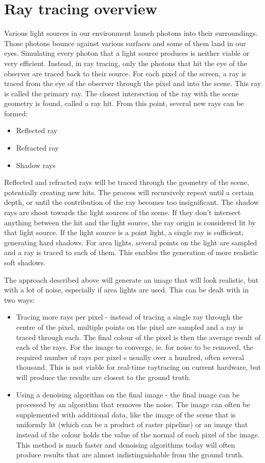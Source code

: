 \documentclass[times, utf8, zavrsni, numeric]{fer}
\begin{document}
\section{Ray tracing overview}
Various light sources in our environment launch photons into their surroundings. Those photons bounce against various surfaces and some of them land in our eyes. Simulating every photon that a light source produces is neither viable or very efficient. Instead, in ray tracing, only the photons that hit the eye of the observer are traced back to their source. For each pixel of the screen, a ray is traced from the eye of the observer through the pixel and into the scene. This ray is called the primary ray. The closest intersection of the ray with the scene geometry is found, called a ray hit. From this point, several new rays can be formed:
\begin{itemize}
\item Reflected ray
\item Refracted ray
\item Shadow rays
\end{itemize}

Reflected and refracted rays will be traced through the geometry of the scene, potentially creating new hits. The process will recursively repeat until a certain depth, or until the contribution of the ray becomes too insignificant. The shadow rays are shoot towards the light sources of the scene. If they don't intersect anything between the hit and the light source, the ray origin is considered lit by that light source. If the light source is a point light, a single ray is sufficient, generating hard shadows. For area lights, several points on the light are sampled and a ray is traced to each of them. This enables the generation of more realistic soft shadows.

The approach described above will generate an image that will look realistic, but with a lot of noise, especially if area lights are used. This can be dealt with in two ways:
\begin{itemize}
\item Tracing more rays per pixel - instead of tracing a single ray through the centre of the pixel, multiple points on the pixel are sampled and a ray is traced through each. The final colour of the pixel is then the average result of each of the rays. For the image to converge, ie. for noise to be removed, the required number of rays per pixel s usually over a hundred, often several thousand. This is not viable for real-time raytracing on current hardware, but will produce the results are closest to the ground truth.
\item Using a denoising algorithm on the final image - the final image can be processed by an algorithm that removes the noise. The image can often be supplemented with additional data, like the image of the scene that is uniformly lit (which can be a product of raster pipeline) or an image that instead of the colour holds the value of the normal of each pixel of the image. This method is much faster and denoising algorithms today will often produce results that are almost indistinguishable from the ground truth.
\end{itemize}
\end{document}

